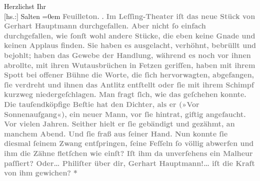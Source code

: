 \begin{ledgroupsized}[t]{13cm}
           \pstart
           Herzlichst Ihr {\\[\baselineskip]}{[}hs.:{]} \spacefill\mbox{Salten}\pend
           \leftskip=0em{}{\bigskip}\pstart
           \noindent{}\centering{}{\pb}\textcolor{gray}{\textbf{\textbf{Feuilleton.}}}\pend
           \pstart
           \noindent{}\centering{}\textcolor{gray}{\textbf{\textbf{.}}}\pend
           \pstart
           \noindent{}\textcolor{gray}{\textbf{Im Leſſing-Theater iſt das
                  neue Stück von Gerhart Hauptmann
                  durchgefallen. Aber nicht ſo einfach durchgefallen, wie ſonſt wohl andere Stücke,
                  die eben keine Gnade und keinen Applaus finden. Sie haben es ausgelacht, verhöhnt,
                  bebrüllt und bejohlt; haben das Gewebe der Handlung, während es noch vor ihnen
                  abrollte, mit ihren Wutausbrüchen in Fetzen geriſſen, haben mit ihrem Spott bei
                  offener Bühne die Worte, die ſich hervorwagten, abgefangen, ſie verdreht und ihnen
                  das Antlitz entſtellt oder ſie mit ihrem Schimpf kurzweg niedergeſchlagen. Man
                  fragt ſich, wie das geſchehen konnte. Die tauſendköpfige Beſtie hat den Dichter,
                  als er (»Vor Sonnenaufgang«), ein neuer Mann,
                  vor ſie hintrat, giftig angefaucht. Vor vielen Jahren. Seither hielt er ſie
                  gebändigt und gezähmt, an manchem Abend. Und ſie fraß aus ſeiner Hand. Nun konnte
                  ſie diesmal ſeinem Zwang entſpringen, ſeine Feſſeln ſo völlig abwerfen und ihm die
                  Zähne fletſchen wie einſt? Iſt ihm da unverſehens ein Malheur paſſiert? Oder{\dots} Philiſter über dir, Gerhart Hauptmann!{\dots} iſt die Kraft von ihm
                  gewichen?}}\pend
           \pstart
           \centering{}\textcolor{gray}{\textbf{*}}\pend
           \pstart

\end{ledgroupsized}
